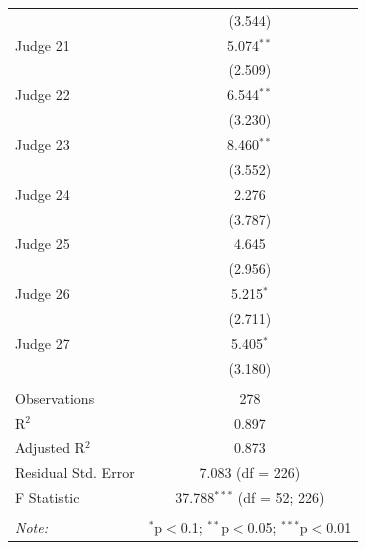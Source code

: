 \documentclass[11pt]{article}
\begin{document}
\begin{table}[H]
\begin{tabular}{@{\extracolsep{5pt}}lc}
        & (3.544) \\
        Judge 21 & 5.074$^{**}$ \\
        & (2.509) \\
        Judge 22 & 6.544$^{**}$ \\
        & (3.230) \\
        Judge 23 & 8.460$^{**}$ \\
        & (3.552) \\
        Judge 24 & 2.276 \\
        & (3.787) \\
        Judge 25 & 4.645 \\
        & (2.956) \\
        Judge 26 & 5.215$^{*}$ \\
        & (2.711) \\
        Judge 27 & 5.405$^{*}$ \\
        & (3.180) \\
       \hline \\[-1.8ex]
      Observations & 278 \\
      R$^{2}$ & 0.897 \\
      Adjusted R$^{2}$ & 0.873 \\
      Residual Std. Error & 7.083 (df = 226) \\
      F Statistic & 37.788$^{***}$ (df = 52; 226) \\
      \hline
      \hline \\[-1.8ex]
      \textit{Note:}  & \multicolumn{1}{r}{$^{*}$p$<$0.1; $^{**}$p$<$0.05; $^{***}$p$<$0.01} \\
      \end{tabular}
    \end{table}
\end{document}
